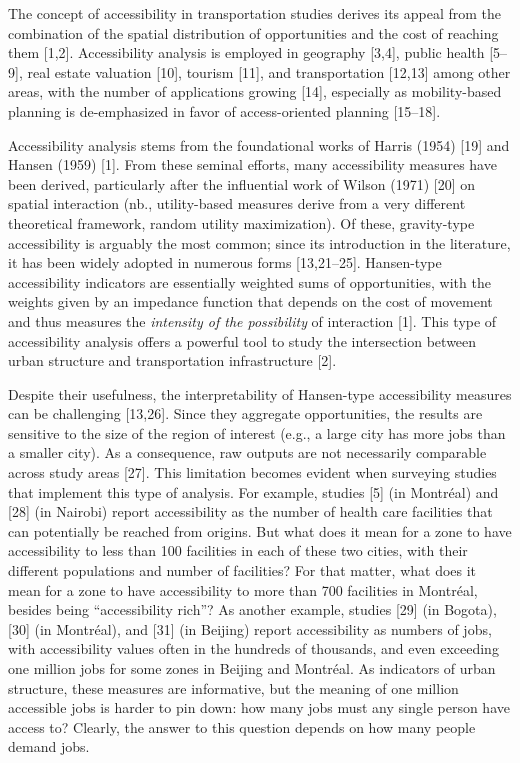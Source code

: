 \documentclass[10pt,letterpaper]{article}
\begin{document}
The concept of accessibility in transportation studies derives its
appeal from the combination of the spatial distribution of opportunities
and the cost of reaching them {[}1,2{]}. Accessibility analysis is
employed in geography {[}3,4{]}, public health {[}5--9{]}, real estate
valuation {[}10{]}, tourism {[}11{]}, and transportation {[}12,13{]}
among other areas, with the number of applications growing {[}14{]},
especially as mobility-based planning is de-emphasized in favor of
access-oriented planning {[}15--18{]}.

Accessibility analysis stems from the foundational works of Harris
(1954) {[}19{]} and Hansen (1959) {[}1{]}. From these seminal efforts,
many accessibility measures have been derived, particularly after the
influential work of Wilson (1971) {[}20{]} on spatial interaction (nb.,
utility-based measures derive from a very different theoretical
framework, random utility maximization). Of these, gravity-type
accessibility is arguably the most common; since its introduction in the
literature, it has been widely adopted in numerous forms
{[}13,21--25{]}. Hansen-type accessibility indicators are essentially
weighted sums of opportunities, with the weights given by an impedance
function that depends on the cost of movement and thus measures the
\emph{intensity of the possibility} of interaction {[}1{]}. This type of
accessibility analysis offers a powerful tool to study the intersection
between urban structure and transportation infrastructure {[}2{]}.

Despite their usefulness, the interpretability of Hansen-type
accessibility measures can be challenging {[}13,26{]}. Since they
aggregate opportunities, the results are sensitive to the size of the
region of interest (e.g., a large city has more jobs than a smaller
city). As a consequence, raw outputs are not necessarily comparable
across study areas {[}27{]}. This limitation becomes evident when
surveying studies that implement this type of analysis. For example,
studies {[}5{]} (in Montréal) and {[}28{]} (in Nairobi) report
accessibility as the number of health care facilities that can
potentially be reached from origins. But what does it mean for a zone to
have accessibility to less than 100 facilities in each of these two
cities, with their different populations and number of facilities? For
that matter, what does it mean for a zone to have accessibility to more
than 700 facilities in Montréal, besides being ``accessibility rich''?
As another example, studies {[}29{]} (in Bogota), {[}30{]} (in
Montréal), and {[}31{]} (in Beijing) report accessibility as numbers of
jobs, with accessibility values often in the hundreds of thousands, and
even exceeding one million jobs for some zones in Beijing and Montréal.
As indicators of urban structure, these measures are informative, but
the meaning of one million accessible jobs is harder to pin down: how
many jobs must any single person have access to? Clearly, the answer to
this question depends on how many people demand jobs.
\end{document}
